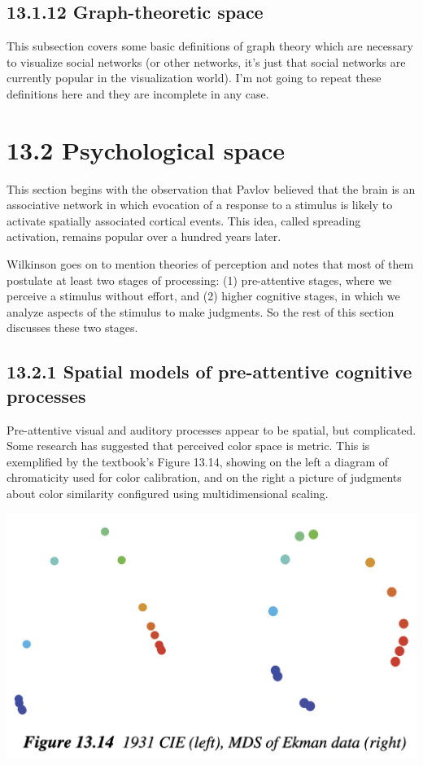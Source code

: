 \hypertarget{graph-theoretic-space}{%
\subsection{13.1.12 Graph-theoretic space}\label{graph-theoretic-space}}

This subsection covers some basic definitions of graph theory which are
necessary to visualize social networks (or other networks, it's just
that social networks are currently popular in the visualization world).
I'm not going to repeat these definitions here and they are incomplete
in any case.

\hypertarget{psychological-space}{%
\section{13.2 Psychological space}\label{psychological-space}}

This section begins with the observation that Pavlov believed that the
brain is an associative network in which evocation of a response to a
stimulus is likely to activate spatially associated cortical events.
This idea, called spreading activation, remains popular over a hundred
years later.

Wilkinson goes on to mention theories of perception and notes that most
of them postulate at least two stages of processing: (1) pre-attentive
stages, where we perceive a stimulus without effort, and (2) higher
cognitive stages, in which we analyze aspects of the stimulus to make
judgments. So the rest of this section discusses these two stages.

\hypertarget{spatial-models-of-pre-attentive-cognitive-processes}{%
\subsection{13.2.1 Spatial models of pre-attentive cognitive
processes}\label{spatial-models-of-pre-attentive-cognitive-processes}}

Pre-attentive visual and auditory processes appear to be spatial, but
complicated. Some research has suggested that perceived color space is
metric. This is exemplified by the textbook's Figure 13.14, showing on
the left a diagram of chromaticity used for color calibration, and on
the right a picture of judgments about color similarity configured using
multidimensional scaling.

\includegraphics{fiCIEvsMDS.png}

